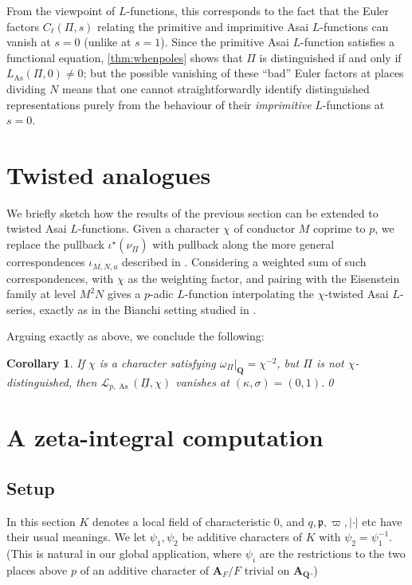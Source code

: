 \documentclass[a4paper,10pt]{amsart}
\theoremstyle{plain}
\newtheorem{corollary}[theorem]{Corollary}
\theoremstyle{remark}
\DeclareMathOperator{\As}{As}
\renewcommand{\AA}{\mathbf{A}}
\newcommand{\QQ}{\mathbf{Q}}
\newcommand{\cL}{\mathcal{L}}
\newcommand{\uPi}{\underline{\Pi}}
\newcommand{\pp}{\mathfrak{p}}
\numberwithin{equation}{section}
\begin{document}
  From the viewpoint of $L$-functions, this corresponds to the fact that the Euler factors $C_\ell(\Pi, s)$ relating the primitive and imprimitive Asai $L$-functions can vanish at $s = 0$ (unlike at $s = 1$). Since the primitive Asai $L$-function satisfies a functional equation, \cref{thm:whenpoles} shows that $\Pi$ is distinguished if and only if $L_{\As}(\Pi, 0) \ne 0$; but the possible vanishing of these ``bad'' Euler factors at places dividing $N$ means that one cannot straightforwardly identify distinguished representations purely from the behaviour of their \emph{imprimitive} $L$-functions at $s = 0$.

 \section{Twisted analogues}

  We briefly sketch how the results of the previous section can be extended to twisted Asai $L$-functions. Given a character $\chi$ of conductor $M$ coprime to $p$, we replace the pullback $\iota^\star\left(\nu_{\underline{\Pi}}\right)$ with pullback along the more general correspondences $\iota_{M, N, a}$ described in \cite{leiloefflerzerbes18}. Considering a weighted sum of such correspondences, with $\chi$ as the weighting factor, and pairing with the Eisenstein family at level $M^2 N$ gives a $p$-adic $L$-function interpolating the $\chi$-twisted Asai $L$-series, exactly as in the Bianchi setting studied in \cite{loefflerwilliams18}.

  Arguing exactly as above, we conclude the following:

  \begin{corollary}
   If $\chi$ is a character satisfying $\omega_{\Pi}|_{\QQ} = \chi^{-2}$, but $\Pi$ is not $\chi$-distinguished, then $\cL_{p,\As}(\uPi, \chi)$ vanishes at $(\kappa, \sigma) = (0, 1)$.\qed
  \end{corollary}

\appendix

\section{A zeta-integral computation}


 \subsection{Setup}

  In this section $K$ denotes a local field of characteristic 0, and $q, \pp, \varpi, |\cdot|$ etc have their usual meanings. We let $\psi_1, \psi_2$ be additive characters of $K$ with $\psi_2 = \psi_1^{-1}$. (This is natural in our global application, where $\psi_i$ are the restrictions to the two places above $p$ of an additive character of $\AA_F / F$ trivial on $\AA_\QQ$.) 
  
\end{document}

